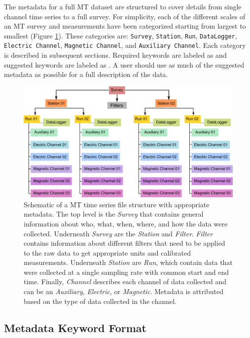 \documentclass[12pt]{article}
\newcommand{\True}[0]{{\color{Red}{\textbf{True}}}}
\newcommand{\False}[0]{{\color{Teal}{\textbf{False}}}}
\begin{document}
The metadata for a full MT dataset are structured to cover details from single channel time series to a full survey. For simplicity, each of the different scales of an MT survey and measurements have been categorized starting from largest to smallest (Figure \ref{fig:example}). These categories are: \verb|Survey|, \verb|Station|, \verb|Run|, \verb|DataLogger|, \verb|Electric Channel|, \verb|Magnetic Channel|, and \verb|Auxiliary Channel|. Each category is described in subsequent sections.  Required keywords are labeled as \True\quad and suggested keywords are labeled as \False. A user should use as much of the suggested metadata as possible for a full description of the data.  

\begin{figure}[htb!]
	\centering
	\includegraphics[height=.525\textwidth]{example_mt_file_structure.pdf}
	\caption{Schematic of a MT time series file structure with appropriate metadata. The top level is the \textit{Survey} that contains general information about who, what, when, where, and how the data were collected.  Underneath \textit{Survey} are the \textit{Station} and \textit{Filter}.  \textit{Filter} contains information about different filters that need to be applied to the raw data to get appropriate units and calibrated measurements.  Underneath \textit{Station} are \textit{Run}, which contain data that were collected at a single sampling rate with common start and end time. Finally, \textit{Channel} describes each channel of data collected and can be an \textit{Auxiliary}, \textit{Electric}, or \textit{Magnetic}.  Metadata is attributed based on the type of data collected in the channel.}
	\label{fig:example}
\end{figure}

\subsection{Metadata Keyword Format}
\end{document}
